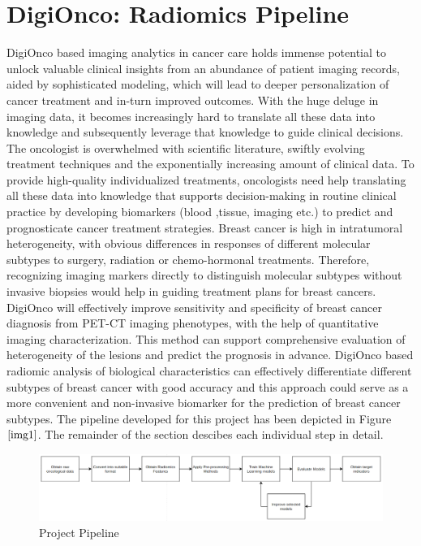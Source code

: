 \documentclass[final,1p,times,twocolumn]{elsarticle}
\begin{document}
\section{DigiOnco: Radiomics Pipeline}
DigiOnco based imaging analytics in cancer care holds immense potential to unlock valuable clinical insights from an abundance of patient imaging records, aided by sophisticated modeling, which will lead to deeper personalization of cancer treatment and in-turn improved outcomes. With the huge deluge in imaging data, it becomes increasingly hard to translate all these data into knowledge and subsequently leverage that knowledge to guide clinical decisions. The oncologist is overwhelmed with scientific literature, swiftly evolving treatment techniques and the exponentially increasing amount of clinical data. To provide high-quality individualized treatments, oncologists need help translating all these data into knowledge that supports decision-making in routine clinical practice by developing biomarkers (blood ,tissue, imaging etc.) to predict and prognosticate cancer treatment strategies.
Breast cancer is high in intratumoral heterogeneity, with obvious differences in responses of different molecular subtypes to surgery, radiation or chemo-hormonal treatments. Therefore, recognizing imaging markers directly to distinguish molecular subtypes without invasive biopsies would help in guiding treatment plans for breast cancers. DigiOnco will effectively improve sensitivity and specificity of breast cancer diagnosis from PET-CT imaging phenotypes, with the help of quantitative imaging characterization. This method can support comprehensive evaluation of heterogeneity of the lesions and predict the prognosis in advance. DigiOnco based radiomic  analysis of  biological characteristics  can effectively differentiate different subtypes of breast cancer with good accuracy and this approach could serve as a more convenient and non-invasive biomarker for the prediction of breast cancer subtypes. The pipeline developed for this project has been depicted in Figure $\ref{img1}$. The remainder of the section descibes each individual step in detail.

\begin{figure}[!b]
\centering
\includegraphics[width=6in]{img1.png}
\caption{Project Pipeline}
\label{img1}
\end{figure}
\end{document}
